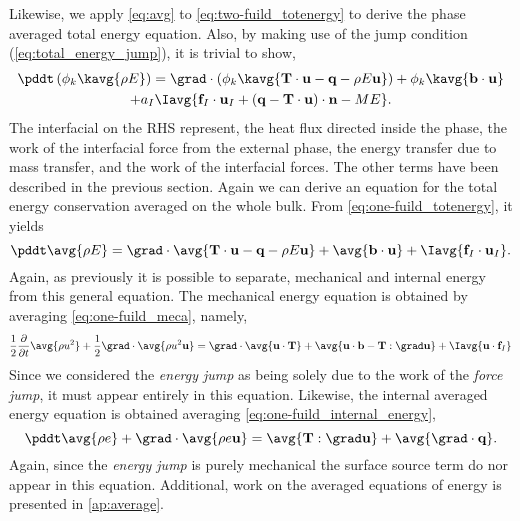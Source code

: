 Likewise, we apply \ref{eq:avg} to \ref{eq:two-fuild_totenergy} to derive the phase averaged total energy equation.
Also, by making use of the jump condition (\ref{eq:total_energy_jump}), it is trivial to show, 
\begin{multline}
    \pddt \left(
        \phi_k\kavg{\rho E}
    \right)
    = \grad \cdot \left(
        \phi_k\kavg{\textbf{T}\cdot\textbf{u}
        - \textbf{q}
        - \rho E \textbf{u} }
    \right)
    + \phi_k\kavg{\textbf{b}\cdot\textbf{u}} \\
    +a_I \Iavg{
        \textbf{f}_I\cdot\textbf{u}_I
        + \left(
        \textbf{q}
        - \textbf{T}\cdot\textbf{u}
        \right) 
        \cdot\textbf{n}
        -M E}.
    \label{eq:avg_k_total_energy}
\end{multline}
The interfacial on the RHS represent, the heat flux directed inside the phase,
the work of the interfacial force from the external phase, the energy transfer due 
to mass transfer, and the work of the interfacial forces.
The other terms have been described in the previous section. 
Again we can derive an equation for the total energy conservation averaged on the whole bulk. 
From \ref{eq:one-fuild_totenergy}, it yields
\begin{equation}
    \pddt \avg{\rho E}
    = \grad \cdot 
        \avg{\textbf{T}\cdot\textbf{u}
        - \textbf{q}
        - \rho E \textbf{u}}
    + \avg{\textbf{b}\cdot\textbf{u}}
    + \Iavg{\textbf{f}_I\cdot\textbf{u}_I}.
    \label{eq:avg_totenergy}
\end{equation}
Again, as previously it is possible to separate, mechanical and internal energy from this general equation. 
The mechanical energy equation is obtained by averaging \ref{eq:one-fuild_meca}, namely,
\begin{equation}
    \frac{1}{2}\frac{\partial }{\partial t}
            \avg{\rho u^2}
    + \frac{1}{2}\grad \cdot 
            \avg{\rho u^2 \textbf{u}}
    = \grad\cdot\avg{\textbf{u}\cdot \textbf{T}}
    +\avg{\textbf{u}\cdot\textbf{b} - \textbf{T}: \grad\textbf{u}}
    +\Iavg{\textbf{u}\cdot\textbf{f}_I}
\end{equation}
Since we considered the \textit{energy jump} as being solely due to the work of the \textit{force jump}, it must appear entirely in this equation. 
Likewise, the internal averaged energy equation is obtained averaging \ref{eq:one-fuild_internal_energy},
\begin{equation}
    \pddt \avg{\rho e}
    + \grad \cdot \avg{\rho  e\textbf{u}}
    = \avg{\textbf{T}:\grad\textbf{u}}
    + \avg{\grad\cdot\textbf{q}}.
\end{equation}
Again, since the \textit{energy jump} is purely mechanical the surface source term do nor appear in this equation. 
Additional, work on the averaged equations of energy is presented in \ref{ap:average}.
